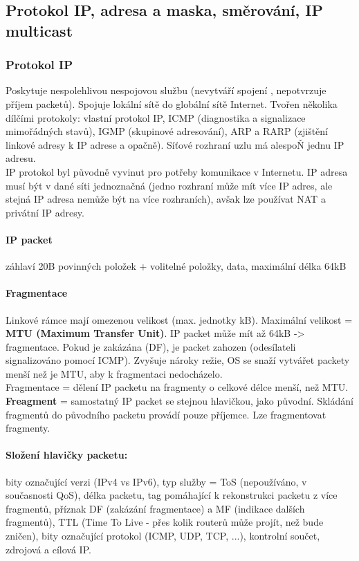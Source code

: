 \documentclass[10pt,a4paper]{article}
\begin{document}
\subsection{Protokol IP, adresa a maska, směrování, IP multicast}
\subsubsection{Protokol IP}
Poskytuje nespolehlivou nespojovou službu (nevytváří spojení , nepotvrzuje příjem packetů). Spojuje lokální sítě do globální sítě Internet. Tvořen několika dílčími protokoly: vlastní protokol IP, ICMP (diagnostika a signalizace mimořádných stavů), IGMP (skupinové adresování), ARP a RARP (zjištění linkové adresy k IP adrese a opačně). Síťové rozhraní uzlu má alespoŇ jednu IP adresu. \\
IP protokol byl původně vyvinut pro potřeby komunikace v Internetu. IP adresa musí být v dané síti jednoznačná (jedno rozhraní může mít více IP adres, ale stejná IP adresa nemůže být na více rozhraních), avšak lze používat NAT a privátní IP adresy.
\paragraph{IP packet} záhlaví 20B povinných položek + volitelné položky, data, maximální délka 64kB
\paragraph{Fragmentace}
Linkové rámce mají omezenou velikost (max. jednotky kB). Maximální velikost = \textbf{MTU (Maximum Transfer Unit)}. IP packet může mít až 64kB -> fragmentace. Pokud je zakázána (DF), je packet zahozen (odesílateli signalizováno pomocí ICMP). Zvyšuje nároky režie, OS se snaží vytvářet packety menší než je MTU, aby k fragmentaci nedocházelo. \\
Fragmentace = dělení IP packetu na fragmenty o celkové délce menší, než MTU. \textbf{Freagment} = samostatný IP packet se stejnou hlavičkou, jako původní. Skládání fragmentů do původního packetu provádí pouze příjemce. Lze fragmentovat fragmenty.
\paragraph{Složení hlavičky packetu:} bity označující verzi (IPv4 vs IPv6), typ služby = ToS (nepoužíváno, v současnosti QoS), délka packetu, tag pomáhající k rekonstrukci packetu z více fragmentů, příznak DF (zakázání fragmentace) a MF (indikace dalších fragmentů), TTL (Time To Live - přes kolik routerů může projít, než bude zničen), bity označující protokol (ICMP, UDP, TCP, ...), kontrolní součet, zdrojová a cílová IP.
\end{document}
